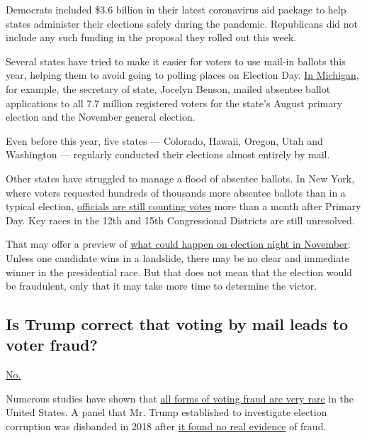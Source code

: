 Democrats included \$3.6 billion in their latest coronavirus aid package
to help states administer their elections safely during the pandemic.
Republicans did not include any such funding in the proposal they rolled
out this week.

Several states have tried to make it easier for voters to use mail-in
ballots this year, helping them to avoid going to polling places on
Election Day.
\href{https://www.nytimes.com/2020/05/20/us/politics/trump-mail-in-voting-absentee-ballots.html}{In
Michigan}, for example, the secretary of state, Jocelyn Benson, mailed
absentee ballot applications to all 7.7 million registered voters for
the state's August primary election and the November general election.

Even before this year, five states --- Colorado, Hawaii, Oregon, Utah
and Washington --- regularly conducted their elections almost entirely
by mail.

Other states have struggled to manage a flood of absentee ballots. In
New York, where voters requested hundreds of thousands more absentee
ballots than in a typical election,
\href{https://www.nytimes.com/2020/07/17/nyregion/election-absentee-ballots-primary.html}{officials
are still counting votes} more than a month after Primary Day. Key races
in the 12th and 15th Congressional Districts are still unresolved.

That may offer a preview of
\href{https://www.nytimes.com/2020/06/24/us/politics/november-2020-election-day-results.html}{what
could happen on election night in November}: Unless one candidate wins
in a landslide, there may be no clear and immediate winner in the
presidential race. But that does not mean that the election would be
fraudulent, only that it may take more time to determine the victor.

\hypertarget{is-trump-correct-that-voting-by-mail-leads-to-voter-fraud}{%
\subsection{Is Trump correct that voting by mail leads to voter
fraud?}\label{is-trump-correct-that-voting-by-mail-leads-to-voter-fraud}}

\href{https://www.nytimes.com/article/mail-in-voting-explained.html}{No.}

Numerous studies have shown that
\href{https://www.nytimes.com/article/mail-in-voting-explained.html}{all
forms of voting fraud are very rare} in the United States. A panel that
Mr. Trump established to investigate election corruption was disbanded
in 2018 after
\href{https://www.nytimes.com/2018/01/03/us/politics/trump-voter-fraud-commission.html}{it
found no real evidence} of fraud.

